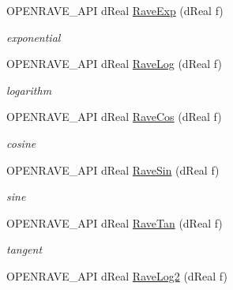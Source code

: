 \begin{DoxyCompactItemize}
\item 
OPENRAVE\_\-API dReal \hyperlink{group__affine__math_gac8e9a4de3eada3445281cf83f63a71ad}{RaveExp} (dReal f)
\begin{DoxyCompactList}\small\item\em exponential \item\end{DoxyCompactList}\item 
\hypertarget{group__affine__math_ga2358b3045fbf4f2dd3d6047c266ddb97}{
OPENRAVE\_\-API dReal \hyperlink{group__affine__math_ga2358b3045fbf4f2dd3d6047c266ddb97}{RaveLog} (dReal f)}
\label{group__affine__math_ga2358b3045fbf4f2dd3d6047c266ddb97}

\begin{DoxyCompactList}\small\item\em logarithm \item\end{DoxyCompactList}\item 
\hypertarget{group__affine__math_gafbca1a5656b1543abb89d45cf8ac4ca3}{
OPENRAVE\_\-API dReal \hyperlink{group__affine__math_gafbca1a5656b1543abb89d45cf8ac4ca3}{RaveCos} (dReal f)}
\label{group__affine__math_gafbca1a5656b1543abb89d45cf8ac4ca3}

\begin{DoxyCompactList}\small\item\em cosine \item\end{DoxyCompactList}\item 
\hypertarget{group__affine__math_ga7941e0b1a64c2dd182c2ac751d08eb1e}{
OPENRAVE\_\-API dReal \hyperlink{group__affine__math_ga7941e0b1a64c2dd182c2ac751d08eb1e}{RaveSin} (dReal f)}
\label{group__affine__math_ga7941e0b1a64c2dd182c2ac751d08eb1e}

\begin{DoxyCompactList}\small\item\em sine \item\end{DoxyCompactList}\item 
\hypertarget{group__affine__math_gae39adb12086da21a4e0fe39c96aff1d6}{
OPENRAVE\_\-API dReal \hyperlink{group__affine__math_gae39adb12086da21a4e0fe39c96aff1d6}{RaveTan} (dReal f)}
\label{group__affine__math_gae39adb12086da21a4e0fe39c96aff1d6}

\begin{DoxyCompactList}\small\item\em tangent \item\end{DoxyCompactList}\item 
\hypertarget{group__affine__math_gaaa147e7be9eb0e01250291e2aa3a81bf}{
OPENRAVE\_\-API dReal \hyperlink{group__affine__math_gaaa147e7be9eb0e01250291e2aa3a81bf}{RaveLog2} (dReal f)}
\label{group__affine__math_gaaa147e7be9eb0e01250291e2aa3a81bf}


\end{DoxyCompactItemize}
